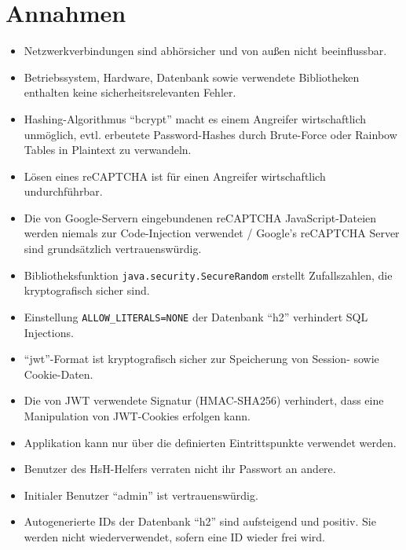 \documentclass[fontsize=12pt,DIV=14,BCOR=10mm,a4paper,parskip=half-,headsepline,headinclude,english,ngerman,bibliography=totocnumbered]{scrreprt}
\begin{document}
\vspace*{-3cm}

\addto{\captionsgerman}{\renewcommand{\refname}{Literaturverzeichnis}}

\clearpage

\tableofcontents  %

\clearpage

\chapter{Annahmen}

\begin{itemize}
  \item Netzwerkverbindungen sind abhörsicher und von außen nicht beeinflussbar.
  \item Betriebssystem, Hardware, Datenbank sowie verwendete Bibliotheken enthalten keine sicherheitsrelevanten Fehler.
  \item Hashing-Algorithmus \enquote{bcrypt} macht es einem Angreifer wirtschaftlich unmöglich, evtl. erbeutete Password-Hashes durch Brute-Force oder Rainbow Tables in Plaintext zu verwandeln.
  \item Lösen eines reCAPTCHA ist für einen Angreifer wirtschaftlich undurchführbar.
  \item Die von Google-Servern eingebundenen reCAPTCHA JavaScript-Dateien werden niemals zur Code-Injection verwendet / Google's reCAPTCHA Server sind grund\-sätzlich vertrauenswürdig.
  \item Bibliotheksfunktion \texttt{java.security.SecureRandom} \autocite{JavaDocs.SecureRandom} erstellt Zufallszahlen, die kryptografisch sicher sind.
  \item Einstellung \texttt{ALLOW\_LITERALS=NONE} der Datenbank \enquote{h2} verhindert SQL Injections.
  \item \enquote{\gls{jwt}}-Format ist kryptografisch sicher zur Speicherung von Session- sowie Cookie-Daten.
  \item Die von JWT verwendete Signatur (HMAC-SHA256) verhindert, dass eine Manipulation von JWT-Cookies erfolgen kann.
  \item Applikation kann nur über die definierten Eintrittspunkte verwendet werden.
  \item Benutzer des HsH-Helfers verraten nicht ihr Passwort an andere.
  \item Initialer Benutzer \enquote{admin} ist vertrauenswürdig.
  \item Autogenerierte IDs der Datenbank \enquote{h2} sind aufsteigend und positiv. Sie werden nicht wiederverwendet, sofern eine ID wieder frei wird.

\end{itemize}
\end{document}
